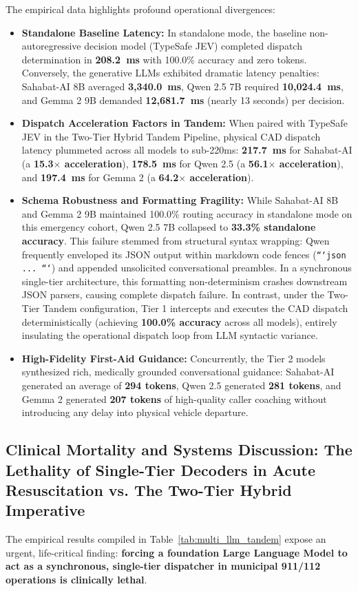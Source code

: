 \documentclass[journal,compsoc]{IEEEtran}
\begin{document}
The empirical data highlights profound operational divergences:
\begin{itemize}
    \item \textbf{Standalone Baseline Latency:} In standalone mode, the baseline non-autoregressive decision model (TypeSafe JEV) completed dispatch determination in \textbf{208.2~ms} with 100.0\% accuracy and zero tokens. Conversely, the generative LLMs exhibited dramatic latency penalties: Sahabat-AI 8B averaged \textbf{3,340.0~ms}, Qwen 2.5 7B required \textbf{10,024.4~ms}, and Gemma 2 9B demanded \textbf{12,681.7~ms} (nearly 13 seconds) per decision.
    \item \textbf{Dispatch Acceleration Factors in Tandem:} When paired with TypeSafe JEV in the Two-Tier Hybrid Tandem Pipeline, physical CAD dispatch latency plummeted across all models to sub-220ms: \textbf{217.7~ms} for Sahabat-AI (a \textbf{15.3$\times$ acceleration}), \textbf{178.5~ms} for Qwen 2.5 (a \textbf{56.1$\times$ acceleration}), and \textbf{197.4~ms} for Gemma 2 (a \textbf{64.2$\times$ acceleration}).
    \item \textbf{Schema Robustness and Formatting Fragility:} While Sahabat-AI 8B and Gemma 2 9B maintained 100.0\% routing accuracy in standalone mode on this emergency cohort, Qwen 2.5 7B collapsed to \textbf{33.3\% standalone accuracy}. This failure stemmed from structural syntax wrapping: Qwen frequently enveloped its JSON output within markdown code fences (\texttt{```json ... ```}) and appended unsolicited conversational preambles. In a synchronous single-tier architecture, this formatting non-determinism crashes downstream JSON parsers, causing complete dispatch failure. In contrast, under the Two-Tier Tandem configuration, Tier 1 intercepts and executes the CAD dispatch deterministically (achieving \textbf{100.0\% accuracy} across all models), entirely insulating the operational dispatch loop from LLM syntactic variance.
    \item \textbf{High-Fidelity First-Aid Guidance:} Concurrently, the Tier 2 models synthesized rich, medically grounded conversational guidance: Sahabat-AI generated an average of \textbf{294 tokens}, Qwen 2.5 generated \textbf{281 tokens}, and Gemma 2 generated \textbf{207 tokens} of high-quality caller coaching without introducing any delay into physical vehicle departure.
\end{itemize}

\subsection{Clinical Mortality and Systems Discussion: The Lethality of Single-Tier Decoders in Acute Resuscitation vs. The Two-Tier Hybrid Imperative}
The empirical results compiled in Table~\ref{tab:multi_llm_tandem} expose an urgent, life-critical finding: \textbf{forcing a foundation Large Language Model to act as a synchronous, single-tier dispatcher in municipal 911/112 operations is clinically lethal}.
\end{document}
